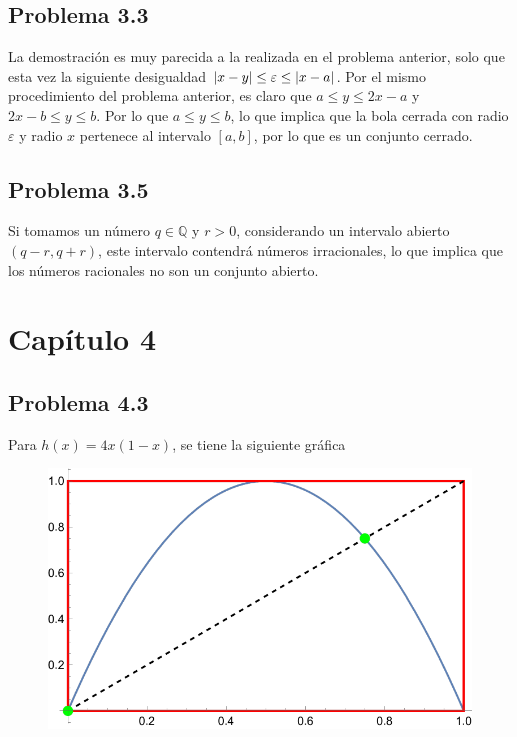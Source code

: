 \documentclass[conference]{IEEEtran}
\newcommand{\Q}{\mathbb{Q}}
\begin{document}
\subsection{Problema 3.3}
La demostración es muy parecida a la realizada en el problema anterior, solo que esta vez la siguiente desigualdad $\abs{x - y} \leq \varepsilon \leq \abs{x - a}$. Por el mismo procedimiento del problema anterior, es claro que $a \leq y \leq 2x - a$ y $2x - b \leq y \leq b$. Por lo que $a \leq y \leq b$, lo que implica que la bola cerrada con radio $\varepsilon$ y radio $x$ pertenece al intervalo $[a,b]$, por lo que es un conjunto cerrado.


\subsection{Problema 3.5}
Si tomamos un número $q\in \Q$ y $r>0$, considerando un intervalo abierto $(q - r,q + r)$, este intervalo contendrá números irracionales, lo que implica que los números racionales no son un conjunto abierto.



\section{Capítulo 4}

\subsection{Problema 4.3}
Para $h(x) = 4x(1-x)$, se tiene la siguiente gráfica

\begin{figure}[H]
	\centering
	\includegraphics[scale=0.4]{./img/p4-3}
\end{figure}
\end{document}
